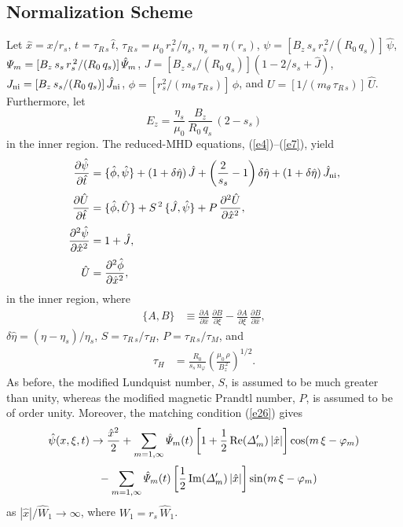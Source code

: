 \documentclass[12pt,prb,aps]{revtex4-1}
\begin{document}
\subsection{Normalization Scheme}
Let $\hat{x}=x/r_s$, $t=\tau_{R\,s}\,\hat{t}$, $\tau_{R\,s} = \mu_0\,r_s^{\,2}/\eta_s$, $\eta_s=\eta(r_s)$, $\psi = [B_z\,s_s\,r_s^{\,2}/(R_0\,q_s)]\,\hat{\psi}$, ${\mit\Psi}_m = [B_z\,s_s\,r_s^{\,2}/(R_0\,q_s)]\,\hat{\mit\Psi}_m$,
$J = [B_z\,s_s/(R_0\,q_s)]\left(1-2/s_s+\hat{J}\right)$, 
$J_{\rm ni} = [B_z\,s_s/(R_0\,q_s)]\,\hat{J}_{\rm ni}$, $\phi= [r_s^2/(m_\theta\,\tau_{R\,s})]\,\hat{\phi}$, and $U= [1/(m_\theta\,\tau_{R\,s})]\,\hat{U}$. 
Furthermore, let
\begin{equation}
E_z = \frac{\eta_s}{\mu_0}\,\frac{B_z}{R_0\,q_s}\,(
2-s_s)
\end{equation}
in the inner region.
The reduced-MHD equations, (\ref{e4})--(\ref{e7}), yield
\begin{align}\label{e38}
\frac{\partial\hat{\psi}}{\partial\hat{t}} &= \{\hat{\phi},\hat{\psi}\} + (1+\delta\hat{\eta})\,\hat{J} + \left(\frac{2}{s_s}-1\right)\delta\hat{\eta} + (1+\delta\hat{\eta})\,\hat{J}_{\rm ni},\\[0.5ex]
\frac{\partial\hat{U}}{\partial\hat{t}}&= \{\hat{\phi},\hat{U}\} + S^{\,2}\,\{\hat{J},\hat{\psi}\}+P\,\frac{\partial^2\hat{U}}{\partial{\hat{x}^2}},\label{e39}\\[0.5ex]
\frac{\partial^2\hat{\psi}}{\partial \hat{x}^2}&= 1+ \hat{J},\label{e40}\\[0.5ex]
\hat{U} &= \frac{\partial^2\hat{\phi}}{\partial \hat{x}^2},\label{e41}
\end{align}
in the inner region, where
\begin{align}
\{A,B\} &\equiv \frac{\partial A}{\partial\hat{x}}\,\frac{\partial B}{\partial\xi} - \frac{\partial A}{\partial\xi}\,\frac{\partial B}{\partial\hat{x}},
\end{align}
$\delta \hat{\eta} = (\eta-\eta_s)/\eta_s$, 
$S = \tau_{R\,s}/\tau_H$,
$P = \tau_{R\,s}/\tau_M$, and
\begin{align}
\tau_H &= \frac{R_0}{s_s\,n_\varphi}\left(\frac{\mu_0\,\rho}{B_z^{\,2}}\right)^{1/2}.
\end{align}
As before, the modified Lundquist number, $S$, is assumed to be much greater than unity, whereas the
modified magnetic Prandtl number, $P$, is assumed to
be of order unity. Moreover, the
matching condition (\ref{e26}) gives
\begin{align}
\hat{\psi}(x,\xi,t) &\rightarrow \frac{\hat{x}^2}{2} +\sum_{m=1,\infty}
\hat{\mit\Psi}_m(t)\left[1+\frac{1}{2}\,{\rm Re}({\mit\Delta}_m')\,|\hat{x}|\right]\cos(m\,\xi-\varphi_m)\nonumber\\[0.5ex]
&\phantom{=} -\sum_{m=1,\infty}\hat{\mit\Psi}_m(t)\left[\frac{1}{2}\,{\rm Im}({\mit\Delta}_m')\,|\hat{x}|\right]\sin(m\,\xi-\varphi_m)\label{e46x}
\end{align}
as $|\hat{x}|/\hat{W}_1\rightarrow\infty$, where
$W_1=r_s\,\hat{W}_1$. 
\end{document}
